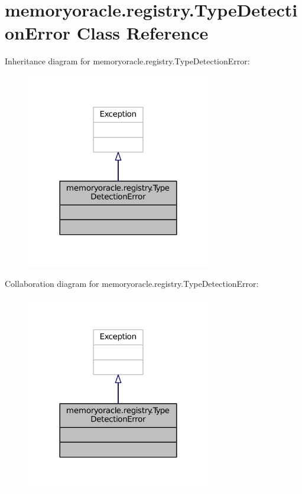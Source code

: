 \hypertarget{classmemoryoracle_1_1registry_1_1TypeDetectionError}{}\section{memoryoracle.\+registry.\+Type\+Detection\+Error Class Reference}
\label{classmemoryoracle_1_1registry_1_1TypeDetectionError}


Inheritance diagram for memoryoracle.\+registry.\+Type\+Detection\+Error\+:
\nopagebreak
\begin{figure}[H]
\begin{center}
\leavevmode
\includegraphics[width=228pt]{classmemoryoracle_1_1registry_1_1TypeDetectionError__inherit__graph}
\end{center}
\end{figure}


Collaboration diagram for memoryoracle.\+registry.\+Type\+Detection\+Error\+:
\nopagebreak
\begin{figure}[H]
\begin{center}
\leavevmode
\includegraphics[width=228pt]{classmemoryoracle_1_1registry_1_1TypeDetectionError__coll__graph}
\end{center}
\end{figure}


